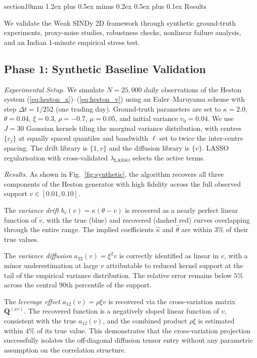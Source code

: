 \documentclass[reprint, amsmath, amssymb, aps, prl, superscriptaddress, nofootinbib]{revtex4-2}
\makeatletter
\def\section{\@startsection
  {section}{1}{0mm}
  {1.2ex plus 0.5ex minus 0.2ex}
  {0.5ex plus 0.1ex}
  {\centering\normalfont\small\bfseries}}
\makeatother
\begin{document}
\section{Results}

We validate the Weak SINDy 2D framework through synthetic ground-truth experiments,
proxy-noise studies, robustness checks, nonlinear failure analysis, and an Indian
1-minute empirical stress test.


\subsection{Phase 1: Synthetic Baseline Validation}

\textit{Experimental Setup.}
We simulate $N = 25{,}000$ daily observations of the Heston system
(\ref{eq:heston_x})--(\ref{eq:heston_v}) using an Euler--Maruyama scheme with
step $\Delta t = 1/252$ (one trading day). Ground-truth parameters are set to
$\kappa = 2.0$, $\theta = 0.04$, $\xi = 0.3$, $\rho = -0.7$, $\mu = 0.05$,
and initial variance $v_0 = 0.04$. We use $J = 30$ Gaussian kernels tiling the
marginal variance distribution, with centres $\{c_j\}$ at equally spaced quantiles
and bandwidth $\ell$ set to twice the inter-centre spacing. The drift library is
$\{1, v\}$ and the diffusion library is $\{v\}$. LASSO regularisation with
cross-validated $\lambda_{\mathrm{LASSO}}$ selects the active terms.

\textit{Results.}
As shown in Fig.~\ref{fig:synthetic}, the algorithm recovers all three components
of the Heston generator with high fidelity across the full observed support
$v \in [0.01, 0.10]$.

The \emph{variance drift} $b_v(v) = \kappa(\theta - v)$ is recovered as a nearly
perfect linear function of $v$, with the true (blue) and recovered (dashed red)
curves overlapping through the entire range. The implied coefficients $\hat\kappa$
and $\hat\theta$ are within $3\%$ of their true values.

The \emph{variance diffusion} $a_{22}(v) = \xi^2 v$ is correctly identified as
linear in $v$, with a minor underestimation at large $v$ attributable to reduced
kernel support at the tail of the empirical variance distribution. The relative
error remains below $5\%$ across the central 90th percentile of the support.

The \emph{leverage effect} $a_{12}(v) = \rho\xi v$ is recovered via the
cross-variation matrix $\mathbf{Q}^{(xv)}$. The recovered function is a negatively
sloped linear function of $v$, consistent with the true $a_{12}(v)$, and the
combined product $\rho\xi$ is estimated within $4\%$ of its true value. This
demonstrates that the cross-variation projection successfully isolates the
off-diagonal diffusion tensor entry without any parametric assumption on the
correlation structure.
\end{document}
